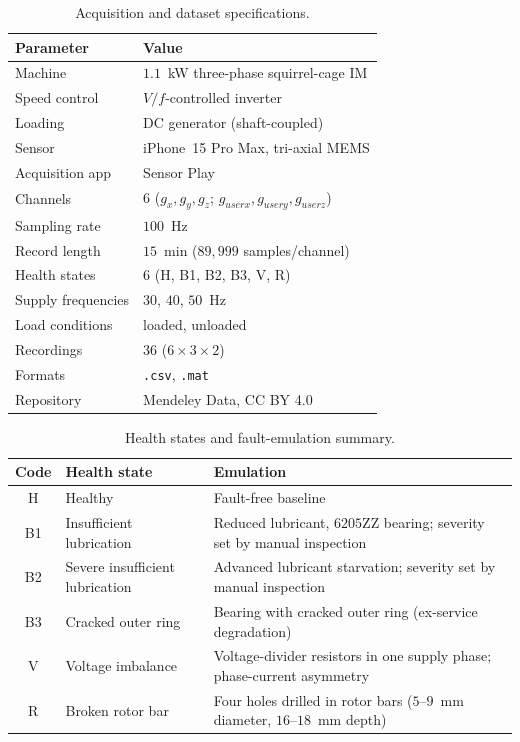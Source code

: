 \begin{table}[t]
\centering
\caption{Acquisition and dataset specifications.}
\label{tab:specs}
\renewcommand{\arraystretch}{1.2}
\begin{tabular}{@{}ll@{}}
\toprule
\textbf{Parameter} & \textbf{Value} \\
\midrule
Machine & $1.1$~kW three-phase squirrel-cage IM \\
Speed control & $V/f$-controlled inverter \\
Loading & DC generator (shaft-coupled) \\
Sensor & iPhone~15 Pro Max, tri-axial MEMS \\
Acquisition app & Sensor Play \\
Channels & $6$ ($g_x,g_y,g_z$; $g_{userx},g_{usery},g_{userz}$) \\
Sampling rate & $100$~Hz \\
Record length & $15$~min ($89{,}999$ samples/channel) \\
Health states & $6$ (H, B1, B2, B3, V, R) \\
Supply frequencies & $30$, $40$, $50$~Hz \\
Load conditions & loaded, unloaded \\
Recordings & $36$ ($6\times3\times2$) \\
Formats & \texttt{.csv}, \texttt{.mat} \\
Repository & Mendeley Data, CC BY 4.0 \\
\bottomrule
\end{tabular}
\end{table}

\begin{table}[t]
\centering
\caption{Health states and fault-emulation summary.}
\label{tab:faults}
\renewcommand{\arraystretch}{1.25}
\begin{tabular}{@{}clp{4.2cm}@{}}
\toprule
\textbf{Code} & \textbf{Health state} & \textbf{Emulation} \\
\midrule
H  & Healthy & Fault-free baseline \\
B1 & Insufficient lubrication & Reduced lubricant, $6205$ZZ bearing; severity set by manual inspection \\
B2 & Severe insufficient lubrication & Advanced lubricant starvation; severity set by manual inspection \\
B3 & Cracked outer ring & Bearing with cracked outer ring (ex-service degradation) \\
V  & Voltage imbalance & Voltage-divider resistors in one supply phase; phase-current asymmetry \\
R  & Broken rotor bar & Four holes drilled in rotor bars ($5$--$9$~mm diameter, $16$--$18$~mm depth) \\
\bottomrule
\end{tabular}
\end{table}

